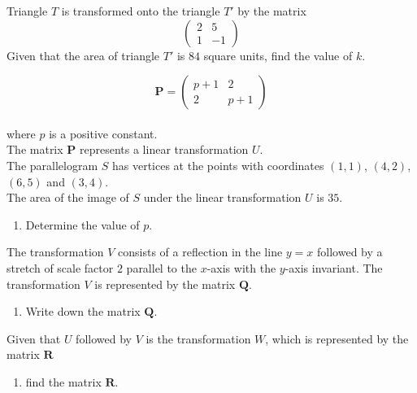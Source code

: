 \documentclass[leqno]{article}
\begin{document}
\begin{enumerate}[
  label=\textbf{\arabic*.},
  leftmargin=*,
  topsep=0pt,
  partopsep=0pt,
  parsep=0pt
]
\begin{enumerate}[label=\textbf{(\roman*)}]
  Triangle $T$ is transformed onto the triangle $T'$ by the matrix
  \[
  \begin{pmatrix}
  2 & 5 \\
  1 & -1
  \end{pmatrix}
  \]
  Given that the area of triangle $T'$ is $84$ square units, find the value of $k$.  \\
\end{enumerate}

\newpage

\questionitem

\[
\mathbf{P}=\begin{pmatrix} p+1 & 2 \\ 2 & p+1 \end{pmatrix}
\] \\
where $p$ is a positive constant. \\

The matrix $\mathbf{P}$ represents a linear transformation $U$. \\
The parallelogram $S$ has vertices at the points with coordinates $(1,1)$, $(4,2)$, $(6,5)$ and $(3,4)$. \\
The area of the image of $S$ under the linear transformation $U$ is $35$. \\

\begin{enumerate}[label=\textbf{(\alph*)}]
  \item Determine the value of $p$.  \\
\end{enumerate}

The transformation $V$ consists of a reflection in the line $y=x$ followed by a stretch of scale factor $2$ parallel to the $x$-axis with the $y$-axis invariant. The transformation $V$ is represented by the matrix $\mathbf{Q}$. \\

\begin{enumerate}[label=\textbf{(\alph*)}, resume]
  \item Write down the matrix $\mathbf{Q}$.  \\
\end{enumerate}

Given that $U$ followed by $V$ is the transformation $W$, which is represented by the matrix $\mathbf{R}$ \\

\begin{enumerate}[label=\textbf{(\alph*)}, resume]
  \item find the matrix $\mathbf{R}$.  \\
\end{enumerate}


\end{enumerate}
\end{document}
